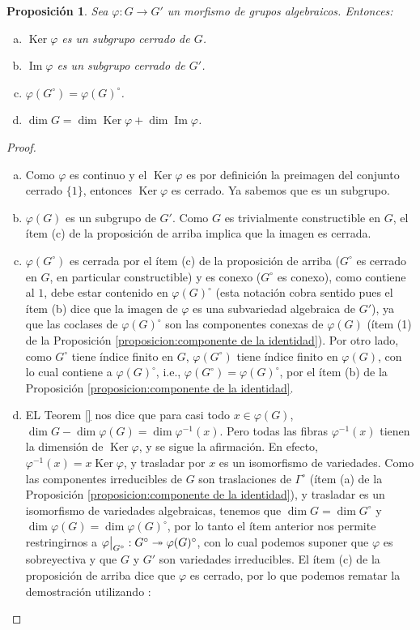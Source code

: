 \documentclass[spanish,10pt]{amsart}
\newcommand{\G}{\Gamma}
\newtheorem{proposition}[theorem]{Proposición}
\theoremstyle{definition}
\theoremstyle{remark}
\numberwithin{equation}{section}
\newcommand{\Imagen}{\operatorname{Im}}
\newcommand{\Ker}{\operatorname{Ker}}
\newcommand\rest[2]{{%
  \left.\kern-\nulldelimiterspace %
  #1 %
  \vphantom{\big|} %
  \right|_{#2} %
  }}
\begin{document}
\begin{proposition}
Sea $\varphi : G \to G'$ un morfismo de grupos algebraicos. Entonces:
\begin{enumerate}[(a)]
\item $\Ker \varphi$ es un subgrupo cerrado de $G$.
\item $\Imagen \varphi$ es un subgrupo cerrado de $G'$.
\item $\varphi (G^\circ) = \varphi (G)^\circ$.
\item $\dim G = \dim \Ker \varphi + \dim \Imagen \varphi$.
\end{enumerate}
\end{proposition}
\begin{proof}
\begin{enumerate}[(a)]
\item Como $\varphi$ es continuo y el $\Ker \varphi$ es por definición la preimagen del conjunto cerrado $\{1\}$, entonces $\Ker \varphi$ es cerrado. Ya sabemos que es un subgrupo.
\item $\varphi (G)$ es un subgrupo de $G'$. Como $G$ es trivialmente constructible en $G$, el ítem (c) de la proposición de arriba implica que la imagen es cerrada.
\item $\varphi (G^\circ)$ es cerrada por el ítem (c) de la proposición de arriba ($G^\circ$ es cerrado en $G$, en particular constructible) y es conexo ($G^\circ$ es conexo), como contiene al $1$, debe estar contenido en $\varphi (G)^\circ$ (esta notación cobra sentido pues el ítem (b) dice que la imagen de $\varphi$ es una subvariedad algebraica de $G'$), ya que las coclases de $\varphi (G)^\circ$ son las componentes conexas de $\varphi (G)$ (ítem (1) de la Proposición \ref{proposicion:componente de la identidad}). Por otro lado, como $G^\circ$ tiene índice finito en $G$, $\varphi (G^\circ)$ tiene índice finito en $\varphi (G)$, con lo cual contiene a $\varphi (G)^\circ$, i.e., $\varphi (G^\circ) = \varphi (G)^\circ$, por el ítem (b) de la Proposición \ref{proposicion:componente de la identidad}.
\item EL Teorem \ref{} nos dice que para casi todo $x \in \varphi (G)$, $\dim G - \dim \varphi (G) = \dim \varphi^{-1} (x)$. Pero todas las fibras $\varphi^{-1} (x)$ tienen la dimensión de $\Ker \varphi$, y se sigue la afirmación. En efecto, $\varphi^{-1} (x) = x \Ker \varphi $, y trasladar por $x$ es un isomorfismo de variedades. Como las componentes irreducibles de $G$ son traslaciones de $\G^\circ$ (ítem (a) de la Proposición \ref{proposicion:componente de la identidad}), y trasladar es un isomorfismo de variedades algebraicas, tenemos que $\dim G = \dim G^\circ$ y $\dim \varphi (G) = \dim \varphi (G)^\circ$, por lo tanto el ítem anterior nos permite restringirnos a $\rest \varphi {G^\circ} : G^\circ \twoheadrightarrow \varphi (G)^\circ$, con lo cual podemos suponer que $\varphi$ es sobreyectiva y que $G$ y $G'$ son variedades irreducibles. El ítem (c) de la proposición de arriba dice que $\varphi$ es cerrado, por lo que podemos rematar la demostración utilizando \cite[Teorema 2.12.13.]{notas_pedro}:

\end{enumerate}
\end{proof}
\end{document}

